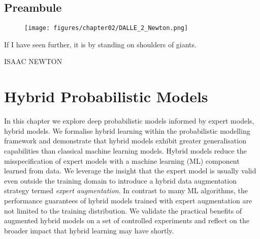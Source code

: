 \thispagestyle{empty}
\section*{Preambule}

\vfill

\begin{figure}[h]
  \centering

  \texttt{[image: figures/chapter02/DALLE\_2\_Newton.png]}
  \label{}
\end{figure}

\vfill

{\centering
\parbox{\textwidth}{%
  \raggedright
  {%

   If I have seen further, it is by standing on shoulders of giants.\par\bigskip
  }
  \raggedleft\MakeUppercase{Isaac Newton}\par%
}}

\vfill\vfill

\chapter{Hybrid Probabilistic Models}\label{ch:07}

\begin{chapter_outline}

In this chapter we explore deep probabilistic models informed by expert models, hybrid models.
We formalise hybrid learning within the probabilistic modelling framework and demonstrate that hybrid models exhibit greater generalisation capabilities than classical machine learning models.
Hybrid models reduce the misspecification of expert models with a machine learning (ML) component learned from data. We leverage the insight that the expert model is usually valid even outside the training domain to introduce a hybrid data augmentation strategy termed \textit{expert augmentation}. In contrast to many ML algorithms, the performance guarantees of hybrid models trained with expert augmentation are not limited to the training distribution. We validate the practical benefits of augmented hybrid models on a set of controlled experiments and reflect on the broader impact that hybrid learning may have shortly.

\end{chapter_outline}


